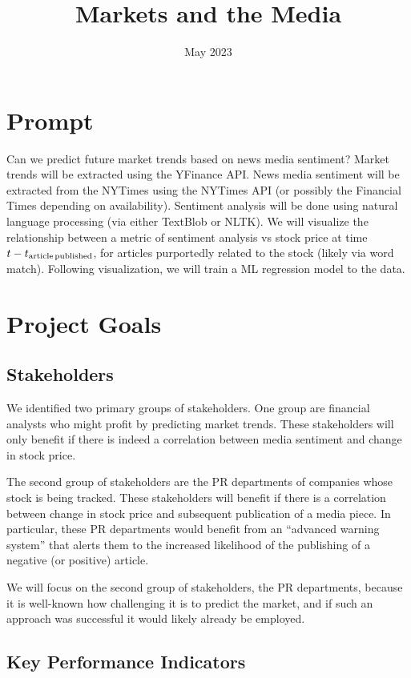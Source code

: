 \documentclass{article}
\title{Markets and the Media}
\date{May 2023}
\begin{document}
\section*{Prompt}

Can we predict future market trends based on news media sentiment?
Market trends will be extracted using the YFinance API.
News media sentiment will be extracted from the NYTimes using the NYTimes API (or possibly the Financial Times depending on availability).
Sentiment analysis will be done using natural language processing (via either TextBlob or NLTK).
We will visualize the relationship between a metric of sentiment analysis vs stock price at time $t - t_{\rm article\,published}$, for articles purportedly related to the stock (likely via word match).
Following visualization, we will train a ML regression model to the data.

\section*{Project Goals}

\subsection*{Stakeholders}

We identified two primary groups of stakeholders.
One group are financial analysts who might profit by predicting market trends.
These stakeholders will only benefit if there is indeed a correlation between media sentiment and change in stock price.

The second group of stakeholders are the PR departments of companies whose stock is being tracked.
These stakeholders will benefit if there is a correlation between change in stock price and subsequent publication of a media piece.
In particular, these PR departments would benefit from an ``advanced warning system'' that alerts them to the increased likelihood of the publishing of a negative (or positive) article.

We will focus on the second group of stakeholders, the PR departments, because it is well-known how challenging it is to predict the market, and if such an approach was successful it would likely already be employed.

\subsection*{Key Performance Indicators}
\end{document}
